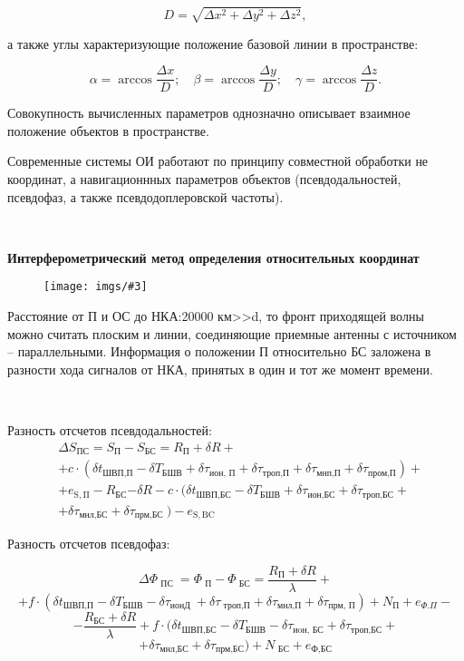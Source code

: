 \documentclass[14pt,a4paper,oneside]{extarticle}
\newcommand{\pic}[3]{
	\begin{figure}[#1]
		\begin{center}
			\texttt{[image: imgs/\#3]}
		\end{center}
	\end{figure}
}
\begin{document}
\[D=\sqrt{\Delta x^{2}+\Delta y^{2}+\Delta z^{2}},\]

а также углы характеризующие положение базовой линии в пространстве:

\[\alpha=\arccos\frac{\Delta x}D;\quad\beta=\arccos\frac{\Delta y}D;\quad\gamma=\arccos\frac{\Delta z}D.\]

Совокупность вычисленных параметров однозначно описывает взаимное положение объектов в пространстве.

Современные системы ОИ работают по принципу совместной обработки не координат, а навигационнных параметров объектов (псевдодальностей, псевдофаз, а также псевдодоплеровской частоты).

\

\textbf{Интерферометрический метод определения относительных координат}

\pic{H}{\textwidth}{9}

Расстояние от П и ОС до НКА:20000 км>>d, то фронт приходящей волны можно считать плоским и линии, соединяющие приемные антенны с источником – параллельными. Информация о положении П относительно БС заложена в разности хода сигналов от НКА, принятых в один и тот же момент времени.

\

Разность отсчетов псевдодальностей:
\[\begin{aligned}
         & \Delta S_{\text{ПС}} = S _ {\text{П}} - S _ {\text{БС}} = R _ {\text{П}} + \delta R +                                                                                                              \\
         & + c \cdot ( \delta t _ {\text{ШВП,П}} - \delta T _ {\text{БШВ}} + \delta \tau _ {\text{ион, П}} + \delta \tau _ {\text{троп,П}} + \delta \tau _ {\text{мнп,П}} + \delta \tau _ {\text{пром,П}} ) + \\
         & + e _ { \mathrm{S,\Pi}} - R _\text{БС}{ - \delta }R-c\cdot(\delta t_{\text{ШВП,БС}} - \delta T _ {\text{БШВ}} + \delta \tau _ {\text{ион,БС}} + \delta \tau _ {\text{троп,БС}} +                   \\
         & +  \delta \tau _ {\text{мнл,БС}} + \delta \tau _ {\text{прм,БС }} ) - e _ { \mathrm{S,BC}}
    \end{aligned}\]

Разность отсчетов псевдофаз:

\[\Delta\Phi_{\text{ ПС }}=\Phi_{\text{ П}}-\Phi_{\text{ БС}}=\frac{R_{\text{П}}+\delta R}{\lambda}+\]
\[+f\cdot(\delta t_{\text{ШВП,П}}-\delta T_{\text{БШВ}}-\delta\tau_{\text{ионД }}+\delta\tau_{\text{ троп,П}}+\delta\tau_{\text{мнл,П}}+\delta\tau_{\text{прм, П}})+N_{\text{П}}+e_{\Phi.\Pi}-\]
\[-\frac{R_{\text{БС}}+\delta R}{\lambda}+f\cdot(\delta t_{\text{ШВП,БС}}-\delta T_{\text{БШВ}}-\delta\tau_{\text{иoн, БС}}+\delta\tau_{\text{троп,БС}}+\]
\[+\delta\tau_{\text{мнл,БС}}+\delta\tau_{\text{прм,БС}})+N_{\text{ БС}}+e_\text{Ф,БС}\]
\end{document}
